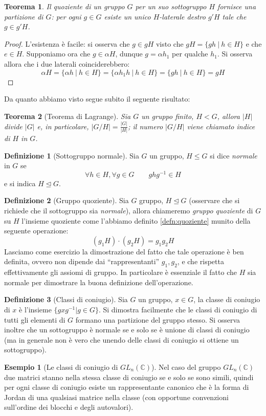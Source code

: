 \documentclass[11pt]{article}
\theoremstyle{plain}
\newtheorem{thm}{Teorema}[section]
\theoremstyle{definition}
\newtheorem{defn}{Definizione}[section]
\newtheorem{exmp}{Esempio}[section]
\theoremstyle{remark}
\newcommand{\C}{\mathbb{C}}
\begin{document}
\begin{thm}
	Il quoziente di un gruppo $G$ per un suo sottogruppo $H$ fornisce una partizione di $G$: per ogni $g\in G$ esiste un unico $H$-laterale destro $g'H$ tale che $g\in g'H$.
\end{thm}
\begin{proof}
	L'esistenza è facile: si osserva che $g\in gH$ visto che $gH=\{gh\ |\ h\in H\}$ e che $e\in H$.
	Supponiamo ora che $g\in \alpha H$, dunque $g=\alpha h_1$ per qualche $h_1$. Si osserva allora che i due laterali coinciderebbero:
	\[\alpha H=\{ \alpha h\ |\ h\in H\} = \{ \alpha h_1 h\ |\ h\in H \} = \{ gh\ |\ h\in H\} = gH\]
\end{proof}

Da quanto abbiamo visto segue subito il seguente risultato:
\begin{thm}[Teorema di Lagrange]
	Sia $G$ un gruppo finito, $H<G$, allora $|H|$ divide $|G|$ e, in particolare, $\displaystyle |G/H|=\frac{|G|}{|H|}$; il numero $|G/H|$ viene chiamato \emph{indice} di $H$ in $G$.
\end{thm}


\begin{defn}[Sottogruppo normale]
Sia $G$ un gruppo, $H \leq G$ si dice \emph{normale} in $G$ se
\[\forall h\in H, \forall g\in G\qquad ghg^{-1}\in H\]
e si indica $H \trianglelefteq G$.
\end{defn}

\begin{defn}[Gruppo quoziente]
	Sia $G$ gruppo, $H\trianglelefteq G$ (osservare che si richiede che il sottogruppo sia \textit{normale}), allora chiameremo \textit{gruppo quoziente} di $G$ su $H$ l'insieme quoziente come l'abbiamo definito \eqref{defn:quoziente} munito della seguente operazione:
	\[(g_1H)\cdot(g_2H)=g_1g_2H\]
	Lasciamo come esercizio la dimostrazione del fatto che tale operazione è ben definita, ovvero non dipende dai ``rappresentanti'' $g_1,g_2$, e che rispetta effettivamente gli assiomi di gruppo. In particolare è essenziale il fatto che $H$ sia normale per dimostrare la buona definizione dell'operazione.
\end{defn}


\begin{defn}[Classi di coniugio]
Sia $G$ un gruppo, $x \in G$, la classe di coniugio di $x$ è l'insieme $\{ gxg^{-1} | g\in G \}$. Si dimostra facilmente che le classi di coniugio di tutti gli elementi di $G$ formano una partizione del gruppo stesso. Si osserva inoltre che un sottogruppo è normale se e solo se è unione di classi di coniugio (ma in generale non è vero che unendo delle classi di coniugio si ottiene un sottogruppo).
\end{defn}
\begin{exmp}[Le classi di coniugio di $GL_n(\C)$]
Nel caso del gruppo $GL_n(\C)$ due matrici stanno nella stessa classe di coniugio se e solo se sono simili, quindi per ogni classe di coniugio esiste un rappresentante canonico che è la forma di Jordan di una qualsiasi matrice nella classe (con opportune convenzioni sull'ordine dei blocchi e degli autovalori).
\end{exmp}
\end{document}
